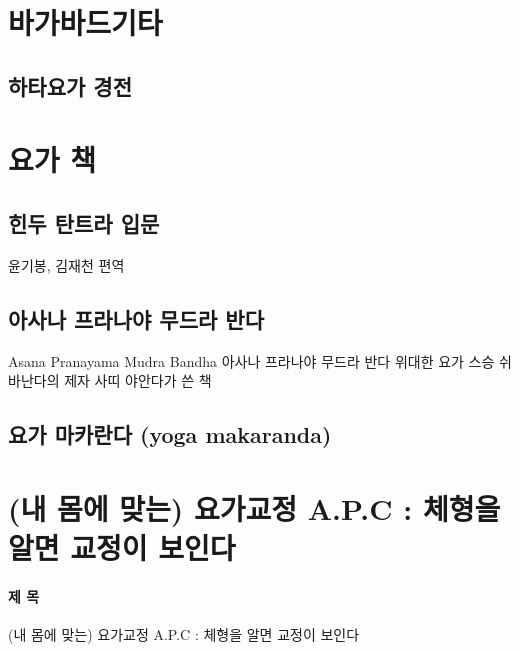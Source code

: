 \documentclass[12pt, a4paper, oneside]{book}
\let\stdsection\section
\renewcommand\section{\newpage\stdsection}
\begin{document}
\section{바가바드기타}





\subsection{하타요가 경전}


%
%
%
\newpage
\section{요가 책}


	\subsection{힌두 탄트라 입문}

			윤기봉, 김재천 편역


	\subsection{아사나 프라나야 무드라 반다}

Asana Pranayama Mudra Bandha
아사나 프라나야 무드라 반다
위대한 요가 스승 쉬바난다의 제자 사띠 야안다가 쓴 책




	\subsection{요가 마카란다 (yoga makaranda)}


%
%
%
\newpage
\section{(내 몸에 맞는) 요가교정 A.P.C : 체형을 알면 교정이 보인다}

\paragraph{제 목}
	(내 몸에 맞는) 요가교정 A.P.C : 체형을 알면 교정이 보인다
\end{document}
